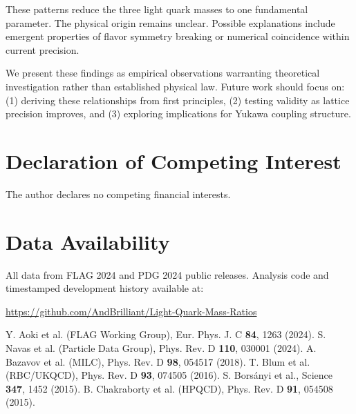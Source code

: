 \documentclass[12pt]{article}
\begin{document}
These patterns reduce the three light quark masses to one fundamental parameter. The physical origin remains unclear. Possible explanations include emergent properties of flavor symmetry breaking or numerical coincidence within current precision.

We present these findings as empirical observations warranting theoretical investigation rather than established physical law. Future work should focus on: (1) deriving these relationships from first principles, (2) testing validity as lattice precision improves, and (3) exploring implications for Yukawa coupling structure.

\section*{Declaration of Competing Interest}
The author declares no competing financial interests.

\section*{Data Availability}
All data from FLAG 2024 and PDG 2024 public releases. Analysis code and timestamped development history available at:

\url{https://github.com/AndBrilliant/Light-Quark-Mass-Ratios}

\begin{thebibliography}{99}

 Y. Aoki et al. (FLAG Working Group), Eur. Phys. J. C \textbf{84}, 1263 (2024).
 S. Navas et al. (Particle Data Group), Phys. Rev. D \textbf{110}, 030001 (2024).
 A. Bazavov et al. (MILC), Phys. Rev. D \textbf{98}, 054517 (2018).
 T. Blum et al. (RBC/UKQCD), Phys. Rev. D \textbf{93}, 074505 (2016).
 S. Borsányi et al., Science \textbf{347}, 1452 (2015).
 B. Chakraborty et al. (HPQCD), Phys. Rev. D \textbf{91}, 054508 (2015).

\end{thebibliography}
\end{document}
